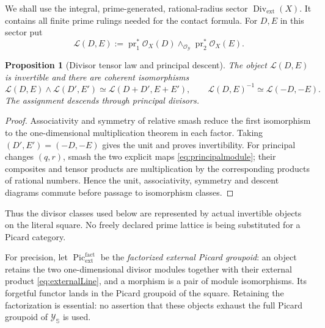 \documentclass[11pt]{amsart}
\newtheorem{proposition}[theorem]{Proposition}
\theoremstyle{definition}
\theoremstyle{remark}
\newcommand{\Div}{\operatorname{Div}}
\newcommand{\Pic}{\operatorname{Pic}}
\begin{document}
We shall use the integral, prime-generated, rational-radius sector
$\Div_{\mathrm{ext}}(X)$.  It contains all finite prime rulings needed for
the contact formula.  For $D,E$ in this sector put
\begin{equation}\label{eq:externalLine}
 \mathcal L(D,E):=\operatorname{pr}_1^*\mathcal O_X(D)
 \wedge_{\mathcal O_{\mathscr Y}}
 \operatorname{pr}_2^*\mathcal O_X(E).
\end{equation}

\begin{proposition}[Divisor tensor law and principal descent]
\label{prop:divisorlines}
The object $\mathcal L(D,E)$ is invertible and there are coherent
isomorphisms
\begin{equation}\label{eq:lineTensorLaw}
 \mathcal L(D,E)\wedge\mathcal L(D',E')
 \simeq\mathcal L(D+D',E+E'),
 \qquad \mathcal L(D,E)^{-1}\simeq\mathcal L(-D,-E).
\end{equation}
The assignment descends through principal divisors.
\end{proposition}

\begin{proof}
Associativity and symmetry of relative smash reduce the first isomorphism
to the one-dimensional multiplication theorem in each factor.  Taking
$(D',E')=(-D,-E)$ gives the unit and proves invertibility.  For principal
changes $(q,r)$, smash the two explicit maps \eqref{eq:principalmodule};
their composites and tensor products are multiplication by the corresponding
products of rational numbers.  Hence the unit, associativity, symmetry and
descent diagrams commute before passage to isomorphism classes.
\end{proof}

Thus the divisor classes used below are represented by actual invertible
objects on the literal square.  No freely declared prime lattice is being
substituted for a Picard category.

For precision, let $\Pic_{\mathrm{ext}}^{\mathrm{fact}}$ be the
\emph{factorized external Picard groupoid}: an object retains the two
one-dimensional divisor modules together with their external product
\eqref{eq:externalLine}, and a morphism is a pair of module isomorphisms.
Its forgetful functor lands in the Picard groupoid of the square.  Retaining
the factorization is essential: no assertion that these objects exhaust the
full Picard groupoid of $\mathscr Y_{\mathbb S}$ is used.
\end{document}
